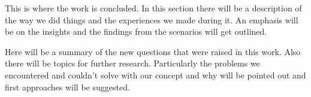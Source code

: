This is where the work is concluded. In this section there will be a description of the way we did things and the experiences we made during it. An emphasis will be on the insights and the findings from the scenarios will get outlined.

Here will be a summary of the new questions that were raised in this work. Also there will be topics for further research. Particularly the problems we encountered and couldn't solve with our concept and why will be pointed out and first approaches will be suggested.




